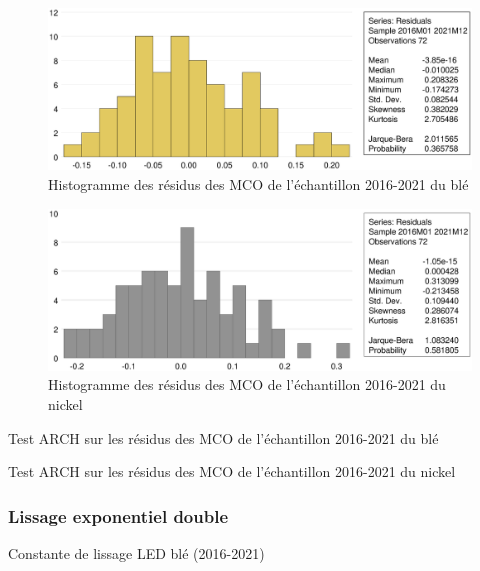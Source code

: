 \documentclass[12pt,a4paper]{article}
\begin{document}
\begin{figure}[H]
    \centering
    \includegraphics[width=\textwidth]{annexe/3_2_mco_hist_ble.eps}
    \caption{Histogramme des résidus des MCO de l'échantillon 2016-2021 du blé}
    \label{fig:mco_hist_ble21}
\end{figure}
\vspace{-1.2cm}
\begin{figure}[H]
    \centering
    \includegraphics[width=\textwidth]{annexe/3_2_mco_hist_nickel.eps}
    \caption{Histogramme des résidus des MCO de l'échantillon 2016-2021 du nickel}
    \label{fig:mco_hist_nickel21}
\end{figure}
\vspace{-0.5cm}
\begin{table}[H]
    \centering
    \caption{Test ARCH sur les résidus des MCO de l'échantillon 2016-2021 du blé}
    \label{tab:mco_homo_ble19}
    \sffamily
    \resizebox{0.6\textwidth}{!}{}
\end{table}

\begin{table}[H]
    \centering
    \caption{Test ARCH sur les résidus des MCO de l'échantillon 2016-2021 du nickel}
    \label{tab:mco_homo_nickel19}
    \sffamily
    \resizebox{0.6\textwidth}{!}{}
\end{table}

\subsubsection{Lissage exponentiel double}\label{appendix:led_21}
\begin{table}[H]
    \centering
    \caption{Constante de lissage LED blé (2016-2021)}
    \label{tab:led_ble21}
    \sffamily
    \resizebox{0.55\textwidth}{!}{}
\end{table}
\end{document}
